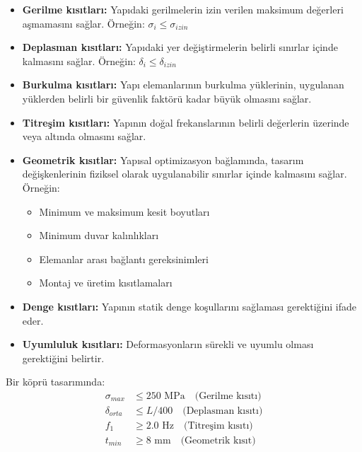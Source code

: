 \begin{itemize}
    \item \textbf{Gerilme kısıtları:} Yapıdaki gerilmelerin izin verilen maksimum değerleri aşmamasını sağlar. Örneğin: $\sigma_i \leq \sigma_{izin}$
    
    \item \textbf{Deplasman kısıtları:} Yapıdaki yer değiştirmelerin belirli sınırlar içinde kalmasını sağlar. Örneğin: $\delta_i \leq \delta_{izin}$
    
    \item \textbf{Burkulma kısıtları:} Yapı elemanlarının burkulma yüklerinin, uygulanan yüklerden belirli bir güvenlik faktörü kadar büyük olmasını sağlar.
    
    \item \textbf{Titreşim kısıtları:} Yapının doğal frekanslarının belirli değerlerin üzerinde veya altında olmasını sağlar.
    
    \item \textbf{Geometrik kısıtlar:} Yapısal optimizasyon bağlamında, tasarım değişkenlerinin fiziksel olarak uygulanabilir sınırlar içinde kalmasını sağlar. Örneğin:
    \begin{itemize}
        \item Minimum ve maksimum kesit boyutları
        \item Minimum duvar kalınlıkları
        \item Elemanlar arası bağlantı gereksinimleri
        \item Montaj ve üretim kısıtlamaları
    \end{itemize}
    
    \item \textbf{Denge kısıtları:} Yapının statik denge koşullarını sağlaması gerektiğini ifade eder.
    
    \item \textbf{Uyumluluk kısıtları:} Deformasyonların sürekli ve uyumlu olması gerektiğini belirtir.
\end{itemize}

\begin{tcolorbox}[title=Yapısal Optimizasyon Kısıtları Örneği]
Bir köprü tasarımında:
\begin{align}
\sigma_{max} &\leq 250 \text{ MPa} \quad \text{(Gerilme kısıtı)} \\
\delta_{orta} &\leq L/400 \quad \text{(Deplasman kısıtı)} \\
f_1 &\geq 2.0 \text{ Hz} \quad \text{(Titreşim kısıtı)} \\
t_{min} &\geq 8 \text{ mm} \quad \text{(Geometrik kısıt)}
\end{align}
\end{tcolorbox}

